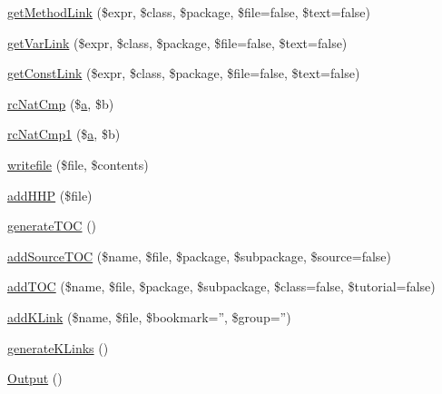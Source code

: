 \begin{DoxyCompactItemize}
\hyperlink{class_c_h_mdefault_converter_a23ab6aa7d92e8ca1cb398a8201d0bd61}{get\-Method\-Link} (\$expr, \$class, \$package, \$file=false, \$text=false)
\item 
\hyperlink{class_c_h_mdefault_converter_a5a0a06a811d1135f4a05c79fb74909db}{get\-Var\-Link} (\$expr, \$class, \$package, \$file=false, \$text=false)
\item 
\hyperlink{class_c_h_mdefault_converter_ad028169d32b0a0293c8bf2fbbff60594}{get\-Const\-Link} (\$expr, \$class, \$package, \$file=false, \$text=false)
\item 
\hyperlink{class_c_h_mdefault_converter_a669301a557a996bf338badc5ca253156}{rc\-Nat\-Cmp} (\$\hyperlink{classa}{a}, \$b)
\item 
\hyperlink{class_c_h_mdefault_converter_ac75bdbfec92cd3025b5bdb5f60e14970}{rc\-Nat\-Cmp1} (\$\hyperlink{classa}{a}, \$b)
\item 
\hyperlink{class_c_h_mdefault_converter_a1c93a4f25fdfd6cf086234507a7d1be7}{writefile} (\$file, \$contents)
\item 
\hyperlink{class_c_h_mdefault_converter_af811c662ed16df9293b6f7dd88654b92}{add\-H\-H\-P} (\$file)
\item 
\hyperlink{class_c_h_mdefault_converter_a533a765e825cf27e50dd3a2ee6c8e7d5}{generate\-T\-O\-C} ()
\item 
\hyperlink{class_c_h_mdefault_converter_a0f88ea17fe620a9d1e62513b1ea03aec}{add\-Source\-T\-O\-C} (\$name, \$file, \$package, \$subpackage, \$source=false)
\item 
\hyperlink{class_c_h_mdefault_converter_a8bb6c1e90d12c1128fd697123db94116}{add\-T\-O\-C} (\$name, \$file, \$package, \$subpackage, \$class=false, \$tutorial=false)
\item 
\hyperlink{class_c_h_mdefault_converter_a78102c2b0f370ebb47a0f52dba7394d8}{add\-K\-Link} (\$name, \$file, \$bookmark='', \$group='')
\item 
\hyperlink{class_c_h_mdefault_converter_a9c456f99232fb9b2e8fd9dcf5633a319}{generate\-K\-Links} ()
\item 
\hyperlink{class_c_h_mdefault_converter_a356172c336fe8c0afbac8c49d5dcc703}{\-Output} ()
\end{DoxyCompactItemize}

